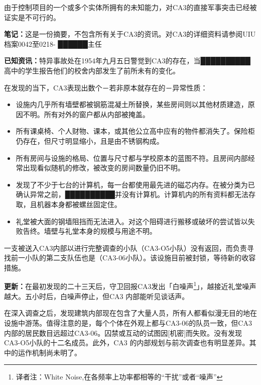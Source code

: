 \documentclass[openany,a4paper]{book} %
\begin{document}
由于控制项目的一个或多个实体所拥有的未知能力，对CA3的直接军事突击已经被证实是不可行的。\vspace{12pt}

\textbf{笔记：}这是一份摘要，不包含所有关于CA3的资讯。对CA3的详细资料请参阅UIU档案0042至0218- ██████主任\vspace{12pt}

\textbf{已知资讯：}特异事故处在1954年九月五日警觉到CA3的存在，当██████████高中的学生报告他们的校舍内部发生了前所未有的变化。\vspace{12pt}

在发现的当下，CA3表现出数个－若非原本就存在的－异常性质：

\begin{itemize}
  \item 设施内几乎所有墙壁都被钢筋混凝土所替换，某些房间则以其他材质建造，原因不明。所有对外的窗户都从内部被掩盖。
  \item 所有课桌椅、个人财物、课本，或其他公立高中应有的物件都消失了。保险柜仍存在，但尺寸明显缩小，且是由不锈钢构成。
  \item 所有房间与设施的格局、位置与尺寸都与学校原本的蓝图不符。且房间内部经常出现看似随机的修改，被改变的房间数量仍旧不明。
  \item 发现了不少于七台的计算机，每一台都使用最先进的磁芯内存。在被分类为已确认异常之前，██████████并没有计算机。计算机内的所有资料都无法存取，且机器本身都被螺丝固定住。
  \item 礼堂被大面的钢墙阻挡而无法进入。对这个阻碍进行搬移或破坏的尝试皆以失败告终。墙壁与礼堂本身的规模与用途不明。
\end{itemize}

一支被送入CA3内部以进行完整调查的小队（CA3-O5小队）没有返回，而负责寻找前一小队的第二支队伍也是（CA3-06小队）。该设施目前被封锁，等待新的收容措施。\vspace{12pt}

\textbf{更新：}在最初发现的二十三天后，守卫回报CA3发出「白噪声\footnote{译者注：White Noise,在各频率上功率都相等的“干扰”或者“噪声”}」，越接近礼堂噪声越大。五小时后，白噪声停止，但CA3 内部能听见谈话声。\vspace{12pt}

在深入调查之后，发现建筑内部现在包含了大量人员，所有人都看似漫无目的地在设施中游荡。值得注意的是，每个个体在外观上都与CA3-06的队员一致，但CA3内部的居民数目远超过CA3-06。囚禁或互动的试图因[机密]而失败。没有发现CA3-O5小队的十二名成员。此外，CA3 的内部规划与前次调查也有明显差异。其中的运作机制尚未明了。\vspace{12pt}
\end{document}

